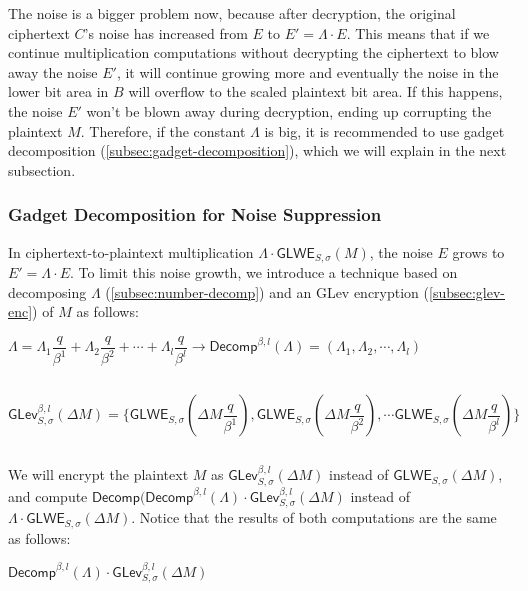 The noise is a bigger problem now, because after decryption, the original ciphertext $C$'s noise has increased from $E$ to $E' = \Lambda \cdot E$. This means that if we continue multiplication computations without decrypting the ciphertext to blow away the noise $E'$, it will continue growing more and eventually the noise in the lower bit area in $B$ will overflow to the scaled plaintext bit area. If this happens, the noise $E'$ won't be blown away during decryption, ending up corrupting the plaintext $M$. Therefore, if the constant $\Lambda$ is big, it is recommended to use gadget decomposition (\autoref{subsec:gadget-decomposition}), which we will explain in the next subsection. 

\subsubsection{Gadget Decomposition for Noise Suppression}
\label{subsubsec:gadget-decomposition-noise-suppression}

In ciphertext-to-plaintext multiplication $\Lambda \cdot \textsf{GLWE}_{S, \sigma}(M)$, the noise $E$ grows to $E' = \Lambda \cdot E$. To limit this noise growth, we introduce a technique based on decomposing $\Lambda$ (\autoref{subsec:number-decomp}) and an GLev encryption (\autoref{subsec:glev-enc}) of $M$ as follows:


$\Lambda = \Lambda_1 \dfrac{q}{\beta^1} + \Lambda_2 \dfrac{q}{\beta^2} + \cdots + \Lambda_l \dfrac{q}{\beta^l} \longrightarrow \textsf{Decomp}^{\beta, l}(\Lambda) = (\Lambda_1, \Lambda_2, \cdots, \Lambda_l)$

$ $

$\textsf{GLev}_{S, \sigma}^{\beta, l}(\Delta M) = \Bigg\{ \textsf{GLWE}_{S, \sigma}\left(\Delta M \dfrac{q}{\beta^1}\right), \textsf{GLWE}_{S, \sigma}\left(\Delta M \dfrac{q}{\beta^2}\right), \cdots \textsf{GLWE}_{S, \sigma}\left(\Delta M \dfrac{q}{\beta^l}\right) \Bigg\}$

$ $


We will encrypt the plaintext $M$ as $\textsf{GLev}_{S, \sigma}^{\beta, l}(\Delta M)$ instead of $\textsf{GLWE}_{S, \sigma}(\Delta M)$, and compute $\textsf{Decomp}(\textsf{Decomp}^{\beta, l}(\Lambda) \cdot \textsf{GLev}_{S, \sigma}^{\beta, l}(\Delta M)$ instead of $\Lambda \cdot \textsf{GLWE}_{S, \sigma}(\Delta M)$. Notice that the results of both computations are the same as follows:

$\textsf{Decomp}^{\beta, l}(\Lambda) \cdot \textsf{GLev}_{S, \sigma}^{\beta, l}(\Delta M)$

